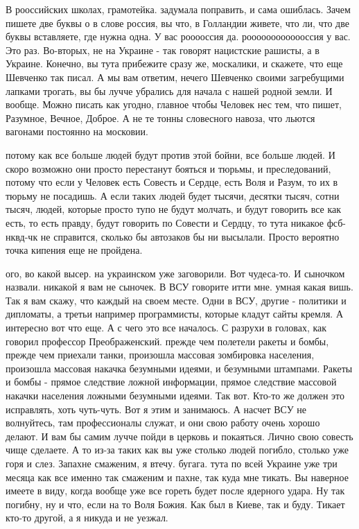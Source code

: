 В рооссийских школах, грамотейка. задумала поправить, и сама ошиблась. Зачем
пишете две буквы о в слове россия, вы что, в Голландии живете, что ли, что две
буквы вставляете, где нужна одна. У вас рооооссия да. рооооооооооооссия у вас.
Это раз. Во-вторых, не на Украине - так говорят нацистские рашисты, а в
Украине. Конечно, вы тута прибежите сразу же, москалики, и скажете, что еще
Шевченко так писал. А мы вам ответим, нечего Шевченко своими загребущими
лапками трогать, вы бы лучче убрались для начала с нашей родной земли. И
вообще. Можно писать как угодно, главное чтобы Человек нес тем, что пишет,
Разумное, Вечное, Доброе. А не те тонны словесного навоза, что льются вагонами
постоянно  на московии.

потому как все больше людей будут против этой бойни, все больше людей. И скоро
возможно они просто перестанут бояться и тюрьмы, и преследований, потому что
если у Человек есть Совесть и Сердце, есть Воля и Разум, то их в тюрьму не
посадишь. А если таких людей будет тысячи, десятки тысяч, сотни тысяч, людей,
которые просто тупо не будут молчать, и будут говорить все как есть, то есть
правду, будут говорить по Совести и Сердцу, то тута никакое фсб-нквд-чк не
справится, сколько бы автозаков бы ни высылали. Просто вероятно точка кипения
еще не пройдена.

ого, во какой высер. на украинском уже заговорили. Вот чудеса-то. И сыночком
назвали. никакой я вам не сыночек. В ВСУ говорите итти мне. умная какая вишь.
Так я вам скажу, что каждый на своем месте. Одни в ВСУ, другие - политики и
дипломаты, а третьи например программисты, которые кладут сайты кремля. А
интересно вот что еще. А с чего это все началось. С разрухи в головах, как
говорил профессор Преображенский. прежде чем полетели ракеты и бомбы, прежде
чем приехали танки, произошла массовая зомбировка населения, произошла массовая
накачка безумными идеями, и безумными штампами. Ракеты и бомбы - прямое
следствие ложной информации, прямое следствие массовой накачки населения
ложными безумными идеями. Так вот. Кто-то же должен это исправлять, хоть
чуть-чуть. Вот я этим и занимаюсь. А насчет ВСУ не волнуйтесь, там
профессионалы служат, и они свою работу очень хорошо делают. И вам бы самим
лучче пойди в церковь и покаяться. Лично свою совесть чище сделаете. А то из-за
таких как вы уже столько людей погибло, столько уже горя и слез. Запахне
смаженим, я втечу. бугага. тута по всей Украине уже три месяца как все именно
так смаженим и пахне, так куда мне тикать. Вы наверное имеете в виду, когда
вообще уже все гореть будет после ядерного удара. Ну так погибну, ну и что,
если на то Воля Божия. Как был в Киеве, так и буду. Тикает кто-то другой, а я
никуда и не уезжал.

